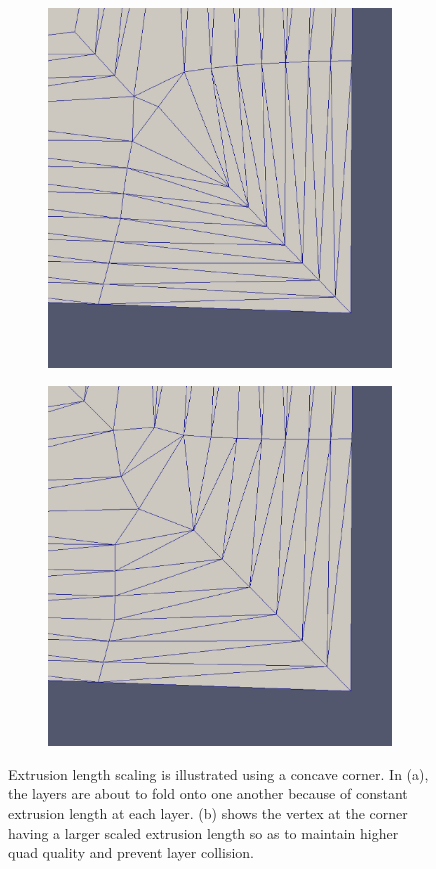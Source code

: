 \documentclass[conf]{new-aiaa}
\begin{document}
\begin{figure}
\centering
\begin{subfigure}{0.4\textwidth}
\includegraphics[width = 0.9\linewidth]{extrusionScaling/withoutScaling.eps}
\caption{}
\label{subfigure-extrusionScaling1}
\centering
\end{subfigure}%
\begin{subfigure}{0.4\textwidth}
\centering
\includegraphics[width = 0.9\linewidth]{extrusionScaling/withScaling.eps}
\caption{}
\label{subfigure-extrusionScaling2}
\end{subfigure}
\caption{Extrusion length scaling is illustrated using a concave corner. In (a), the layers are about to fold onto one another because of constant extrusion length at each layer. (b) shows the vertex at the corner having a larger scaled extrusion length so as to maintain higher quad quality and prevent layer collision.}
\label{fig-extrusionScaling}
\end{figure}
\end{document}
